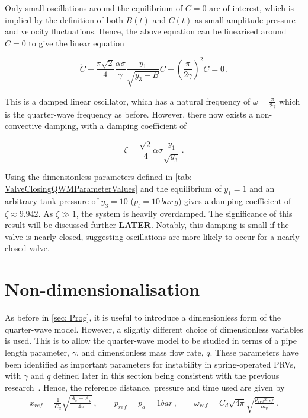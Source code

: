 Only small oscillations around the equilibrium of $C = 0$ are of interest, which is implied by the definition of both $B(t)$ and $C(t)$ as small amplitude pressure and velocity fluctuations. Hence, the above equation can be linearised around $C = 0$ to give the linear equation

\begin{equation*} \label{eq: QWMBehaviourTheory}
    \ddot{C} + \frac{\pi \sqrt{2}}{4} \frac{\alpha \sigma}{\gamma} \frac{y_1}{\sqrt{y_3 + B}} \dot{C} + \left( \frac{\pi}{2 \gamma} \right)^2 C = 0 \, .
\end{equation*}

This is a damped linear oscillator, which has a natural frequency of $\omega = \frac{\pi}{2 \gamma}$ which is the quarter-wave frequency as before. However, there now exists a non-convective damping, with a damping coefficient of

\begin{equation*}
    \zeta = \frac{\sqrt{2}}{4} \alpha \sigma \frac{y_1}{\sqrt{y_3}} \, .
\end{equation*}

Using the dimensionless parameters defined in \cref{tab: ValveClosingQWMParameterValues} and the equilibrium of $y_1 = 1$ and an arbitrary tank pressure of $y_3 = 10$ ($p_t = 10 \, \si{bar \, g}$) gives a damping coefficient of $\zeta \approx 9.942$. As $\zeta \gg 1$, the system is heavily overdamped. The significance of this result will be discussed further \textbf{LATER}. Notably, this damping is small if the valve is nearly closed, suggesting oscillations are more likely to occur for a nearly closed valve.

\section{Non-dimensionalisation} \label{subsec: QWMNonDim}

As before in \cref{sec: Prog}, it is useful to introduce a dimensionless form of the quarter-wave model. However, a slightly different choice of dimensionless variables is used. This is to allow the quarter-wave model to be studied in terms of a pipe length parameter, $\gamma$, and dimensionless mass flow rate, $q$. These parameters have been identified as important parameters for instability in spring-operated PRVs, with $\gamma$ and $q$ defined later in this section being consistent with the previous research~\cite{Hos2016DynamicService}. Hence, the reference distance, pressure and time used are given by
~
\begin{equation*}
\begin{split}
    x_{ref} = \frac{1}{C_d} \sqrt{\frac{A_v - A_p}{4 \pi}}
    \, , \qquad
    p_{ref} = p_a = 1 \si{bar}
    \, , \qquad
    \omega_{ref} = C_d \sqrt{4 \pi} \sqrt{\frac{p_{ref} x_{ref}}{m_v}} \, .
\end{split}
\end{equation*}

